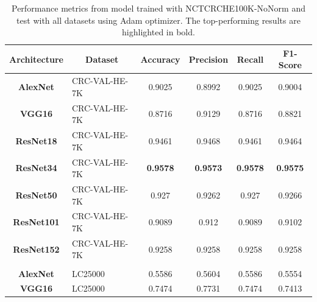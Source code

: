 \begin{table}[t!]
\centering

\caption{Performance metrics from model trained with \gls{NCTCRCHE100K}-NoNorm and test with all datasets using Adam optimizer. The top-performing results are highlighted in bold.}
\label{table_NCTCRCHE100K-nonorm_adam}

\begin{tabular}{|c|l|c|c|c|c|}
\hline
\textbf{Architecture}  & \multicolumn{1}{c|}{\textbf{Dataset}} & \textbf{Accuracy}          & \textbf{Precision}    & \textbf{Recall}       & \textbf{F1-Score}     \\ \hline
\textbf{AlexNet}       & CRC-VAL-HE-7K                         & 0.9025                & 0.8992                & 0.9025                & 0.9004                \\ \hline
\textbf{VGG16}         & CRC-VAL-HE-7K                         & 0.8716                & 0.9129                & 0.8716                & 0.8821                \\ \hline
\textbf{ResNet18}      & CRC-VAL-HE-7K                         & 0.9461                & 0.9468                & 0.9461                & 0.9464                \\ \hline
\textbf{ResNet34}      & CRC-VAL-HE-7K                         & \textbf{0.9578}                & \textbf{0.9573}                & \textbf{0.9578}                & \textbf{0.9575}                \\ \hline
\textbf{ResNet50}      & CRC-VAL-HE-7K                         & 0.927                 & 0.9262                & 0.927                 & 0.9266                \\ \hline
\textbf{ResNet101}     & CRC-VAL-HE-7K                         & 0.9089                & 0.912                 & 0.9089                & 0.9102                \\ \hline
\textbf{ResNet152}     & CRC-VAL-HE-7K                         & 0.9258                & 0.9258                & 0.9258                & 0.9258                \\ \hline
\multicolumn{1}{|l|}{} &                                       & \multicolumn{1}{l|}{} & \multicolumn{1}{l|}{} & \multicolumn{1}{l|}{} & \multicolumn{1}{l|}{} \\ \hline
\textbf{AlexNet}       & LC25000                               & 0.5586                & 0.5604                & 0.5586                & 0.5554                \\ \hline
\textbf{VGG16}         & LC25000                               & 0.7474                & 0.7731                & 0.7474                & 0.7413                \\ \hline

\end{tabular}
\end{table}
